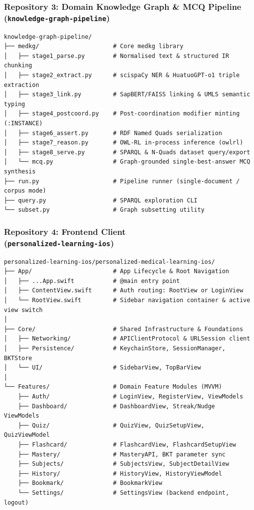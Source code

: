 \subsubsection*{Repository 3: Domain Knowledge Graph \& MCQ Pipeline\\{\normalsize\normalfont(\texttt{knowledge-graph-pipeline})}}

{\small
\begin{verbatim}
knowledge-graph-pipeline/
├── medkg/                     # Core medkg library
│   ├── stage1_parse.py        # Normalised text & structured IR chunking
│   ├── stage2_extract.py      # scispaCy NER & HuatuoGPT-o1 triple extraction
│   ├── stage3_link.py         # SapBERT/FAISS linking & UMLS semantic typing
│   ├── stage4_postcoord.py    # Post-coordination modifier minting (:INSTANCE)
│   ├── stage6_assert.py       # RDF Named Quads serialization
│   ├── stage7_reason.py       # OWL-RL in-process inference (owlrl)
│   ├── stage8_serve.py        # SPARQL & N-Quads dataset query/export
│   └── mcq.py                 # Graph-grounded single-best-answer MCQ synthesis
├── run.py                     # Pipeline runner (single-document / corpus mode)
├── query.py                   # SPARQL exploration CLI
└── subset.py                  # Graph subsetting utility
\end{verbatim}
}

\subsubsection*{Repository 4: Frontend Client\\{\normalsize\normalfont(\texttt{personalized-learning-ios})}}

{\small
\begin{verbatim}
personalized-learning-ios/personalized-medical-learning-ios/
├── App/                       # App Lifecycle & Root Navigation
│   ├── ...App.swift           # @main entry point
│   ├── ContentView.swift      # Auth routing: RootView or LoginView
│   └── RootView.swift         # Sidebar navigation container & active view switch
│
├── Core/                      # Shared Infrastructure & Foundations
│   ├── Networking/            # APIClientProtocol & URLSession client
│   ├── Persistence/           # KeychainStore, SessionManager, BKTStore
│   └── UI/                    # SidebarView, TopBarView
│
└── Features/                  # Domain Feature Modules (MVVM)
    ├── Auth/                  # LoginView, RegisterView, ViewModels
    ├── Dashboard/             # DashboardView, Streak/Nudge ViewModels
    ├── Quiz/                  # QuizView, QuizSetupView, QuizViewModel
    ├── Flashcard/             # FlashcardView, FlashcardSetupView
    ├── Mastery/               # MasteryAPI, BKT parameter sync
    ├── Subjects/              # SubjectsView, SubjectDetailView
    ├── History/               # HistoryView, HistoryViewModel
    ├── Bookmark/              # BookmarkView
    └── Settings/              # SettingsView (backend endpoint, logout)
\end{verbatim}
}

